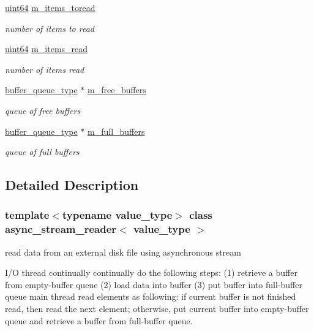 \begin{DoxyCompactItemize}
\hyperlink{types_8h_a60e8696a4678cd348e991a1f172e53f7}{uint64} \hyperlink{classasync__stream__reader_acbf67b037e53db6a995079a8e9ffac57}{m\+\_\+items\+\_\+toread}
\begin{DoxyCompactList}\small\item\em number of items to read \end{DoxyCompactList}\item 
\hyperlink{types_8h_a60e8696a4678cd348e991a1f172e53f7}{uint64} \hyperlink{classasync__stream__reader_a81e8aa844cad035565f9c194a0d3968b}{m\+\_\+items\+\_\+read}
\begin{DoxyCompactList}\small\item\em number of items read \end{DoxyCompactList}\item 
\hyperlink{classasync__stream__reader_a5301e887b098a0ade898265ca6935d68}{buffer\+\_\+queue\+\_\+type} $\ast$ \hyperlink{classasync__stream__reader_a15a955920c4b23bd70ef0b9e5aebf0df}{m\+\_\+free\+\_\+buffers}
\begin{DoxyCompactList}\small\item\em queue of free buffers \end{DoxyCompactList}\item 
\hyperlink{classasync__stream__reader_a5301e887b098a0ade898265ca6935d68}{buffer\+\_\+queue\+\_\+type} $\ast$ \hyperlink{classasync__stream__reader_a5713212cfddf2a29459e70a8d2852a44}{m\+\_\+full\+\_\+buffers}
\begin{DoxyCompactList}\small\item\em queue of full buffers \end{DoxyCompactList}\end{DoxyCompactItemize}


\subsection{Detailed Description}
\subsubsection*{template$<$typename value\+\_\+type$>$\newline
class async\+\_\+stream\+\_\+reader$<$ value\+\_\+type $>$}

read data from an external disk file using asynchronous stream 

I/O thread continually continually do the following steps\+: (1) retrieve a buffer from empty-\/buffer queue (2) load data into buffer (3) put buffer into full-\/buffer queue main thread read elements as following\+: if current buffer is not finished read, then read the next element; otherwise, put current buffer into empty-\/buffer queue and retrieve a buffer from full-\/buffer queue. 

